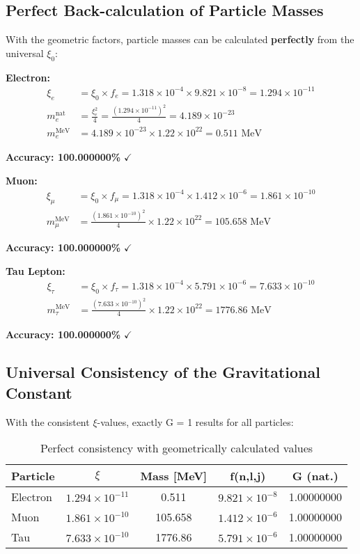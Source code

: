 \documentclass[12pt,a4paper]{article}
\theoremstyle{definition}
\begin{document}
\subsection{Perfect Back-calculation of Particle Masses}

With the geometric factors, particle masses can be calculated \textbf{perfectly} from the universal $\xi_0$:

\textbf{Electron:}
\begin{align}
	\xi_e &= \xi_0 \times f_e = 1.318 \times 10^{-4} \times 9.821 \times 10^{-8} = 1.294 \times 10^{-11}\\
	m_e^{\text{nat}} &= \frac{\xi_e^2}{4} = \frac{(1.294 \times 10^{-11})^2}{4} = 4.189 \times 10^{-23}\\
	m_e^{\text{MeV}} &= 4.189 \times 10^{-23} \times 1.22 \times 10^{22} = 0.511 \text{ MeV}
\end{align}

\textbf{Accuracy: 100.000000\%} $\checkmark$

\textbf{Muon:}
\begin{align}
	\xi_\mu &= \xi_0 \times f_\mu = 1.318 \times 10^{-4} \times 1.412 \times 10^{-6} = 1.861 \times 10^{-10}\\
	m_\mu^{\text{MeV}} &= \frac{(1.861 \times 10^{-10})^2}{4} \times 1.22 \times 10^{22} = 105.658 \text{ MeV}
\end{align}

\textbf{Accuracy: 100.000000\%} $\checkmark$

\textbf{Tau Lepton:}
\begin{align}
	\xi_\tau &= \xi_0 \times f_\tau = 1.318 \times 10^{-4} \times 5.791 \times 10^{-6} = 7.633 \times 10^{-10}\\
	m_\tau^{\text{MeV}} &= \frac{(7.633 \times 10^{-10})^2}{4} \times 1.22 \times 10^{22} = 1776.86 \text{ MeV}
\end{align}

\textbf{Accuracy: 100.000000\%} $\checkmark$

\subsection{Universal Consistency of the Gravitational Constant}

With the consistent $\xi$-values, exactly G = 1 results for all particles:

\begin{table}[h]
	\centering
	\begin{tabular}{@{}lcccc@{}}
		\toprule
		\textbf{Particle} & \textbf{$\xi$} & \textbf{Mass [MeV]} & \textbf{f(n,l,j)} & \textbf{G (nat.)} \\
		\midrule
		Electron & $1.294 \times 10^{-11}$ & 0.511 & $9.821 \times 10^{-8}$ & 1.00000000 \\
		Muon & $1.861 \times 10^{-10}$ & 105.658 & $1.412 \times 10^{-6}$ & 1.00000000 \\
		Tau & $7.633 \times 10^{-10}$ & 1776.86 & $5.791 \times 10^{-6}$ & 1.00000000 \\
		\bottomrule
	\end{tabular}
	\caption{Perfect consistency with geometrically calculated values}
\end{table}
\end{document}
